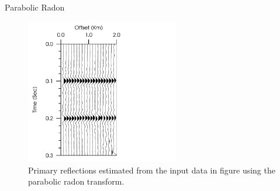 \documentclass[xcolor=dvipsnames,notes]{beamer}
\begin{document}
\begin{frame}{Parabolic Radon}
\begin{figure}
\includegraphics[width=0.6\textwidth]{Fig/fig-6-prim.pdf} 
\caption{Primary reflections estimated from the input data in figure \protect{\ref{fig-6-data}}
         using the parabolic radon transform.}
\end{figure}
\end{frame}
%
\end{document}
